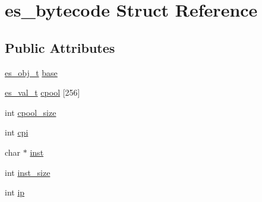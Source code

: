 \hypertarget{structes__bytecode}{\section{es\-\_\-bytecode Struct Reference}
\label{structes__bytecode}
}
\subsection*{Public Attributes}
\begin{DoxyCompactItemize}
\item 
\hyperlink{eva_8h_a3370a89a85f5ff467ca5e7dba47e63bc}{es\-\_\-obj\-\_\-t} \hyperlink{structes__bytecode_aa7380d727ecddf7b2a01493909c2c9e8}{base}
\item 
\hyperlink{eva_8h_a31286b308f3660f383b567314be88045}{es\-\_\-val\-\_\-t} \hyperlink{structes__bytecode_a4a4d60218e393f7541561114e91e3412}{cpool} \mbox{[}256\mbox{]}
\item 
int \hyperlink{structes__bytecode_af722cca8107019f0978e30cb2a7eb135}{cpool\-\_\-size}
\item 
int \hyperlink{structes__bytecode_acfdfeb814740896faec5eac87710668b}{cpi}
\item 
char $\ast$ \hyperlink{structes__bytecode_a066a52cfb1ee403ffe408ca986443beb}{inst}
\item 
int \hyperlink{structes__bytecode_af4a6b07557646c0878c84a55fa401943}{inst\-\_\-size}
\item 
int \hyperlink{structes__bytecode_a7730b507b8973e4dcd32b73f342075d9}{ip}
\end{DoxyCompactItemize}


